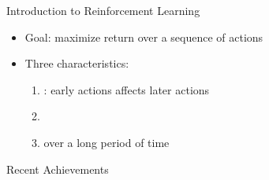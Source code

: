 \documentclass[10pt]{beamer}
\begin{document}
\begin{frame}{Introduction to Reinforcement Learning}

\begin{itemize}
\item {\color{uured} Goal}: maximize return over a sequence of actions\pause
\item Three characteristics:
\begin{enumerate}
\item {}: early actions affects later actions\pause
\item {}\pause
\item {} over a long period of time
\end{enumerate}
\end{itemize}

\end{frame}


\begin{frame}{Recent Achievements}

\begin{figure}[h]
\centering
{}
\end{figure}

\end{frame}
\end{document}
